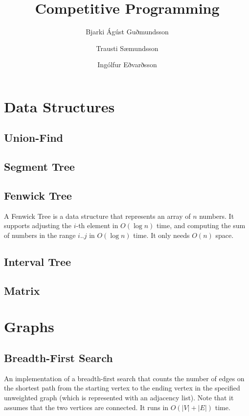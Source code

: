 \documentclass[11pt,a4paper,titlepage]{article}
\title{Competitive Programming}
\author{Bjarki Ágúst Guðmundsson \and Trausti Sæmundsson \and Ingólfur Eðvarðsson}
\begin{document}
	\maketitle
	\tableofcontents
	\newpage

	\section{Data Structures}

		\subsection{Union-Find}
			

		\subsection{Segment Tree}

		\subsection{Fenwick Tree}
			A Fenwick Tree is a data structure that represents an array of $n$ numbers. It supports adjusting the $i$-th element in $O(\log n)$ time, and computing the sum of numbers in the range $i..j$ in $O(\log n)$ time. It only needs $O(n)$ space.
			

		\subsection{Interval Tree}

		\subsection{Matrix}
			

	\section{Graphs}

		\subsection{Breadth-First Search}

			An implementation of a breadth-first search that counts the number of edges on the shortest path from the starting vertex to the ending vertex in the specified unweighted graph (which is represented with an adjacency list). Note that it assumes that the two vertices are connected. It runs in $O(|V|+|E|)$ time.
			
\end{document}

